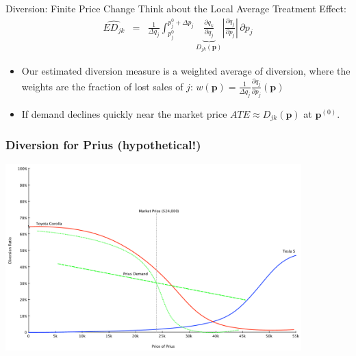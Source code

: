 \documentclass[xcolor=pdftex,dvipsnames,table,mathserif]{beamer}
\begin{document}
\begin{frame}{Diversion: Finite Price Change}
Think about the \alert{Local Average Treatment Effect}:
\begin{eqnarray*}
\widehat{ED_{jk} }&=& \frac{1}{\Delta q_j} \int_{p_j^{0}}^{p_j^{0}+\Delta p_j} \underbrace{\frac{\partial q_k}{\partial q_j}}_{D_{jk}(\mathbf{p})} \left| \frac{\partial q_j}{\partial p_j} \right|\, \partial p_j
\end{eqnarray*}
\begin{itemize}
\item Our estimated diversion measure is a weighted average of diversion, where the weights are the fraction of lost sales of $j$:  $w(\mathbf{p}) = \frac{1}{\Delta q_j} \frac{\partial q_j}{\partial p_j} (\mathbf{p})$
\item If demand declines quickly near the market price $ATE \approx D_{jk}(\mathbf{p})$ at $\mathbf{p}^{(0)}$.
\end{itemize}
\end{frame}

\begin{frame}
\frametitle{Diversion for Prius (hypothetical!)}
\begin{center}
\includegraphics[width=4.5in]{resources/sillydiversion.pdf}
\end{center}
\end{frame}
\end{document}
